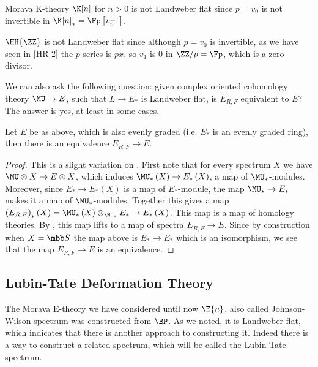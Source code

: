 \begin{example}
	Morava K-theory $\K[n]$ for $n > 0$ is not Landweber flat since $p = v_0$ is not invertible in $\K[n]_* = \Fp\left[v_n^{\pm 1}\right]$.
\end{example}

\begin{example}
	$\HH{\ZZ}$ is not Landweber flat since although $p = v_0$ is invertible, as we have seen in \ref{HR-2} the $p$-series is $px$, so $v_1$ is $0$ in $\ZZ/p = \Fp$, which is a zero divisor.
\end{example}

We can also ask the following question: given complex oriented cohomology theory $\MU \to E$, such that $L \to E_*$ is Landweber flat, is $E_{R,F}$ equivalent to $E$?
The answer is yes, at least in some cases.

\begin{theorem}\label{LEFT-even}
	Let $E$ be as above, which is also evenly graded (i.e. $E_*$ is an evenly graded ring), then there is an equivalence $E_{R,F} \to E$.
\end{theorem}

\begin{proof}
	This is a slight variation on \cite[18, proposition 11]{Lur}.
	First note that for every spectrum $X$ we have $\MU \otimes X \to E \otimes X$, which induces $\MU_*\left(X\right) \to E_*\left(X\right)$, a map of $\MU_*$-modules.
	Moreover, since $E_* \to E_*\left(X\right)$ is a map of $E_*$-module, the map $\MU_* \to E_*$ makes it a map of $\MU_*$-modules.
	Together this gives a map $\left(E_{R,F}\right)_*\left(X\right) = \MU_*\left(X\right) \otimes_{\MU_*} E_* \to E_*\left(X\right)$.
	This map is a map of homology theories. 
	By \cite[17, theorem 6]{Lur} , this map lifts to a map of spectra $E_{R,F} \to E$.
	Since by construction when $X = \SS$ the map above is $E_* \to E_*$ which is an isomorphism, we see that the map $E_{R,F} \to E$ is an equivalence.
\end{proof}



\subsection{Lubin-Tate Deformation Theory}

The Morava E-theory we have considered until now $\E{n}$, also called Johnson-Wilson spectrum was constructed from $\BP$.
As we noted, it is Landweber flat, which indicates that there is another approach to constructing it.
Indeed there is a way to construct a related spectrum, which will be called the Lubin-Tate spectrum.

